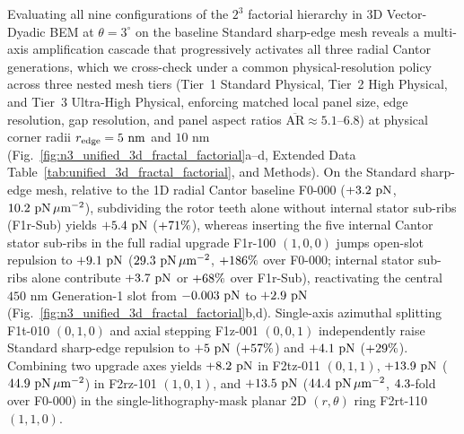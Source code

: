 \documentclass[pdflatex,sn-nature]{sn-jnl}
\DeclareRobustCommand{\roundzero}[1]{\fpeval{round(#1,0)}}
\DeclareRobustCommand{\roundone}[1]{\fpeval{round(#1,1)}}
\DeclareRobustCommand{\roundthree}[1]{\fpeval{round(#1,3)}}
\begin{document}
Evaluating all nine configurations of the $2^3$ factorial hierarchy in 3D Vector-Dyadic BEM at $\theta = 3^\circ$ on the baseline Standard sharp-edge mesh reveals a multi-axis amplification cascade that progressively activates all three radial Cantor generations, which we cross-check under a common physical-resolution policy across three nested mesh tiers (Tier~1 Standard Physical, Tier~2 High Physical, and Tier~3 Ultra-High Physical, enforcing matched local panel size, edge resolution, gap resolution, and panel aspect ratios $\overline{\mathrm{AR}} \approx 5.1\text{--}6.8$) at physical corner radii $r_{\rm edge} = 5\text{ nm}$ and $10\text{ nm}$ (Fig.~\ref{fig:n3_unified_3d_fractal_factorial}a--d, Extended Data Table~\ref{tab:unified_3d_fractal_factorial}, and Methods). On the Standard sharp-edge mesh, relative to the 1D radial Cantor baseline F0-000 ($+\roundone{\NthreeUnithreedFzerozerozeroFzPn}\text{ pN}$, $\roundone{\NthreeUnithreedFzerozerozeroFa}\text{ pN}\,\mu\text{m}^{-2}$), subdividing the rotor teeth alone without internal stator sub-ribs (F1r-Sub) yields $+\roundone{\NthreeUnithreedFonerSubFzPn}\text{ pN}$ ($+\roundzero{\NthreeUnithreedSingleEffectRSubPct}\%$), whereas inserting the five internal Cantor stator sub-ribs in the full radial upgrade F1r-100 $(1,0,0)$ jumps open-slot repulsion to $+\roundone{\NthreeUnithreedFonezerozeroRFzPn}\text{ pN}$ ($\roundone{\NthreeUnithreedFonezerozeroRFa}\text{ pN}\,\mu\text{m}^{-2}$, $+\roundzero{\NthreeUnithreedSingleEffectRPct}\%$ over F0-000; internal stator sub-ribs alone contribute $+\roundone{\NthreeUnithreedStatorSubribGainPn}\text{ pN}$ or $+\roundzero{\NthreeUnithreedStatorSubribGainPct}\%$ over F1r-Sub), reactivating the central $450\text{ nm}$ Generation-1 slot from $\roundthree{\NthreeUnithreedSlotfourFzerozerozeroPn}\text{ pN}$ to $+\roundone{\NthreeUnithreedSlotfourFonezerozeroPn}\text{ pN}$ (Fig.~\ref{fig:n3_unified_3d_fractal_factorial}b,d). Single-axis azimuthal splitting F1t-010 $(0,1,0)$ and axial stepping F1z-001 $(0,0,1)$ independently raise Standard sharp-edge repulsion to $+\roundone{\NthreeUnithreedFzeroonezeroThetaFzPn}\text{ pN}$ ($+\roundzero{\NthreeUnithreedSingleEffectThetaPct}\%$) and $+\roundone{\NthreeUnithreedFzerozerooneZFzPn}\text{ pN}$ ($+\roundzero{\NthreeUnithreedSingleEffectZPct}\%$). Combining two upgrade axes yields $+\roundone{\NthreeUnithreedFzerooneoneThetazFzPn}\text{ pN}$ in F2tz-011 $(0,1,1)$, $+\roundone{\NthreeUnithreedFonezerooneRzFzPn}\text{ pN}$ ($\roundone{\NthreeUnithreedFonezerooneRzFa}\text{ pN}\,\mu\text{m}^{-2}$) in F2rz-101 $(1,0,1)$, and $+\roundone{\NthreeUnithreedFoneonezeroRthetaPlanarFzPn}\text{ pN}$ ($\roundone{\NthreeUnithreedFoneonezeroRthetaPlanarFa}\text{ pN}\,\mu\text{m}^{-2}$, $\roundone{\NthreeUnithreedRatioFoneonezeroPlanarVsFzerozerozero}$-fold over F0-000) in the single-lithography-mask planar 2D $(r,\theta)$ ring F2rt-110 $(1,1,0)$.
\end{document}
